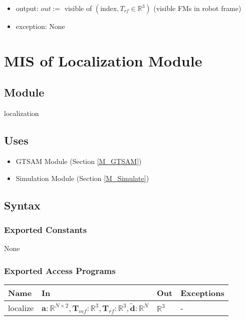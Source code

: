 \documentclass[12pt, titlepage]{article}
\begin{document}
\begin{itemize}
  \item output: $out :=$ visible of $(\text{index}, T_{rf} \in \mathbb{R}^3)$ (visible FMs in robot frame)
  \item exception: None
\end{itemize}



\newpage

\section{MIS of Localization Module} \label{M_Localize}

\subsection{Module}

localization

\subsection{Uses}
\begin{itemize}
  \item GTSAM Module (Section \ref{M_GTSAM})
  \item Simulation Module (Section \ref{M_Simulate})
  
\end{itemize}
\subsection{Syntax}

\subsubsection{Exported Constants}
None

\subsubsection{Exported Access Programs}

\begin{center}
\begin{tabular}{p{2cm} p{7cm} p{4cm} p{3cm}}
\hline
\textbf{Name} & \textbf{In} & \textbf{Out} & \textbf{Exceptions} \\
\hline
localize & $\mathbf{a}:\mathbb{R}^{N \times 2}, \mathbf{T}_{mf}:\mathbb{R}^3, \mathbf{T}_{rf}: \mathbb{R}^3,\mathbf{\tilde{d}}:\mathbb{R}^N$ & $\mathbb{R}^3$ & - \\
\hline
\end{tabular}
\end{center}
\end{document}
